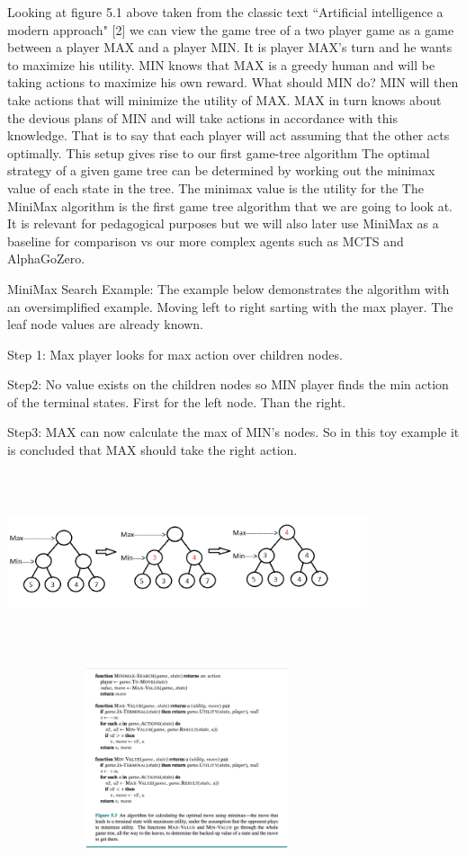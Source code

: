 \begin{search_page}
Looking at figure 5.1 above taken from the classic text ``Artificial intelligence a modern approach" [2] we can view the game tree of a two player game as a game between a player MAX and a player MIN. It is player MAX's turn and he wants to maximize his utility. MIN knows that MAX is a greedy human and will be taking actions to maximize his own reward. What should MIN do? MIN will then take actions that will minimize the utility of MAX. MAX in turn knows about the devious plans of MIN and will take actions in accordance with this knowledge. That is to say that each player will act assuming that the other acts optimally. This setup gives rise to our first game-tree algorithm  
The optimal strategy of a given game tree can be determined by working out the minimax value of each state in the tree. The minimax value is the utility for the 
The MiniMax algorithm is the first game tree algorithm that we are going to look at. It is relevant for pedagogical purposes but we will also later use MiniMax as a baseline for comparison vs our more complex agents such as MCTS and AlphaGoZero. 

MiniMax Search Example: The example below demonstrates the algorithm with an oversimplified example. Moving left to right sarting with the max player. The leaf node values are already known. 

Step 1: Max player looks for max action over children nodes. 

Step2: No value exists on the children nodes so MIN player finds the min action of the terminal states. First for the left node. Than the right. 

Step3: MAX can now calculate the max of MIN's nodes. So in this toy example it is concluded that MAX should take the right action. 

\includegraphics[width=400px,height=200px]{images/minimax_example.png}

\includegraphics[width=400px,height=200px]{images/minimax_algo.png}


\end{search_page}
